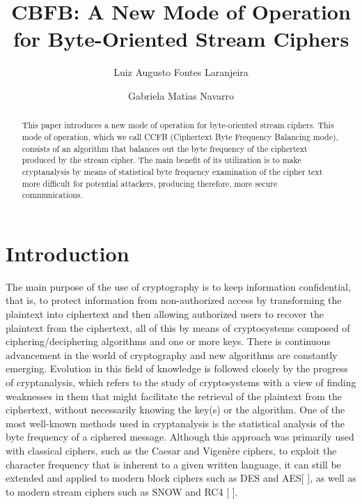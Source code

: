 \documentclass{llncs}
\begin{document}
\title{CBFB: A New Mode of Operation for Byte-Oriented Stream Ciphers}
%
%
\author{Luiz Augusto Fontes Laranjeira \and Gabriela Matias Navarro }
%
%
%
%

\maketitle              %

\begin{abstract}
This paper introduces a new mode of operation for byte-oriented stream ciphers. This mode of operation, which we call CCFB (Ciphertext Byte Frequency Balancing mode), consists of an algorithm that balances out the byte frequency of the ciphertext produced by the stream cipher. The main benefit of its utilization is to make cryptanalysis by means of statistical byte frequency examination of the cipher text more difficult for potential attackers, producing therefore, more secure communications.  
\end{abstract}
%
\section{Introduction}
%
The main purpose of the use of cryptography is to keep information confidential, that is, to protect information from non-authorized access by transforming the plaintext into ciphertext and then allowing authorized users to recover the plaintext from the ciphertext, all of this by means of cryptosystems composed of ciphering/deciphering algorithms and one or more keys. There is continuous advancement in the world of cryptography and new algorithms are constantly emerging. Evolution in this field of knowledge is followed closely by the progress of cryptanalysis, which refers to the study of cryptosystems with a view of finding weaknesses in them that might facilitate the retrieval of the plaintext from the ciphertext, without necessarily knowing the key(s) or the algorithm.
%
One of the most well-known methods used in cryptanalysis is the statistical analysis of the byte frequency of a ciphered message. Although this approach was primarily used with classical ciphers, such as the Caesar and Vigenère ciphers, to exploit the character frequency that is inherent to a given written language, it can still be extended and applied to modern block ciphers such as DES and AES[ ], as well as to modern stream ciphers such as SNOW and RC4 [ ].
\end{document}
